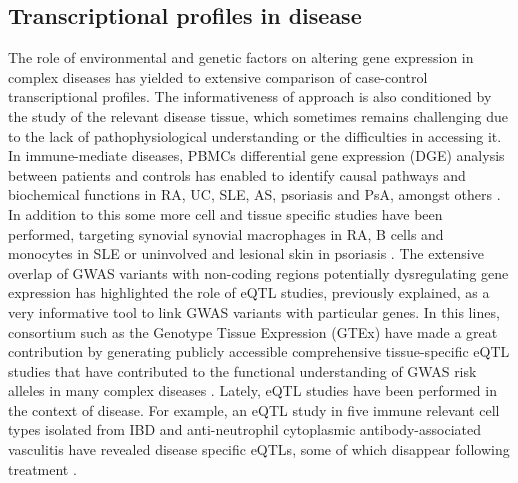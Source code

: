 \subsection{Transcriptional profiles in disease}
The role of environmental and genetic factors on altering gene expression in complex diseases has yielded to extensive comparison of case-control transcriptional profiles. The informativeness of approach is also conditioned by the study of the relevant disease tissue, which sometimes remains challenging due to the lack of pathophysiological understanding or the difficulties in accessing it. In immune-mediate diseases, PBMCs differential gene expression (DGE) analysis between patients and controls has enabled to identify causal pathways and biochemical functions in RA, UC, SLE, AS, psoriasis and PsA, amongst others \parencite{MIao2013,Junta2009,Baechler2003,Assassi2010,Batliwalla2005}. In addition to this some more cell and tissue specific studies have been performed, targeting synovial synovial macrophages in RA, B cells and monocytes in SLE or uninvolved and lesional skin in psoriasis \parencite{Katschke2001,Dozmorov2015,Jabbari2012}. The extensive overlap of GWAS variants with non-coding regions potentially dysregulating gene expression has highlighted the role of eQTL studies, previously explained, as a very informative tool to link GWAS variants with particular genes. In this lines, consortium such as the Genotype
Tissue Expression (GTEx) have made a great contribution by generating publicly accessible comprehensive tissue-specific eQTL studies that have contributed to the functional understanding of GWAS risk alleles in many complex diseases . Lately, eQTL studies have been performed in the context of disease. For example, an eQTL study in five immune relevant cell types isolated from IBD and anti-neutrophil cytoplasmic antibody-associated vasculitis have revealed disease specific eQTLs, some of which disappear following treatment \parencite{Peters2016}.

